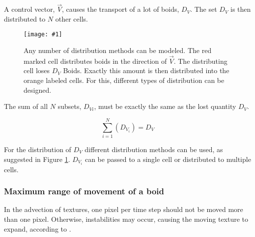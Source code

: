 \documentclass[a4paper, 10pt, journal]{wissarbIEEE}      %
\newcommand{\bild}[3]{
\begin{figure}[h]
\centering
  \texttt{[image: \#1]}
  \caption{#3}
  \label{#1}
\end{figure}}
\begin{document}

A control vector, $\vec{V}$, causes the transport of a lot of boids, $D_V$. The set $D_V$ is then distributed to $N$ other cells.

\bild{bilder/LeafEqEnter}{8cm}{Any number of distribution methods can be modeled. The red marked cell distributes boids in the direction of $\vec{V}$. The distributing cell loses $D_V$ Boids. Exactly this amount is then distributed into the orange labeled cells. For this, different types of distribution can be designed.
}

The sum of all $N$ subsets, $D_{Vi}$, must be exactly the same as the lost quantity $D_V$.


\begin{equation}
\sum_{i=1}^N(D_{V_i}) = D_V
\label{Form_SummeD_V_i}
\end{equation}

For the distribution of $D_V$  different distribution methods can be used, as suggested in Figure \ref{bilder/LeafEqEnter}.
$D_{V_i}$ can be passed to a single cell or distributed to multiple cells.


\subsubsection{Maximum range of movement of a boid}

In the advection of textures, one pixel per time step should not be moved more than one pixel. Otherwise, instabilities may occur, causing the moving texture to expand, according to \cite{GPUGems1}.


\end{document}
